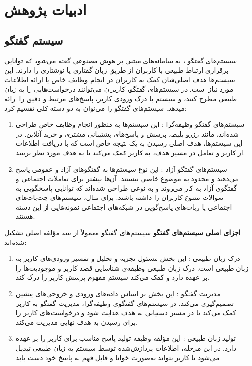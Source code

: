\section{ادبیات پژوهش}
\label{ResearchLiterature:my}

\subsection{سیستم گفتگو}

سیستم‌های گفتگو%
،
 به سامانه‌های مبتنی بر هوش مصنوعی گفته می‌شود که توانایی برقراری ارتباط طبیعی با کاربران از طریق زبان گفتاری یا نوشتاری را دارند. این سیستم‌ها هدف اصلی‌شان کمک به کاربران در انجام وظایف خاص یا ارائه اطلاعات مورد نیاز است. در سیستم‌های گفتگو، کاربران می‌توانند درخواست‌هایی را به زبان طبیعی مطرح کنند، و سیستم با درک ورودی کاربر، پاسخ‌های مرتبط و دقیق را ارائه میدهد.
\newline
سیستم‌های گفتگو را می‌توان به دو دسته کلی تقسیم کرد:
\begin{enumerate}
\item
سیستم‌های گفتگو وظیفه‌گرا%
: این سیستم‌ها به منظور انجام وظایف خاص طراحی شده‌اند، مانند رزرو بلیط، پرسش و پاسخ‌های پشتیبانی مشتری و خرید آنلاین. در این سیستم‌ها، هدف اصلی رسیدن به یک نتیجه خاص است که با دریافت اطلاعات از کاربر و تعامل در مسیر هدف، به کاربر کمک می‌کند تا به هدف مورد نظر برسد.
\item
سیستم‌های گفتگو آزاد%
: این نوع سیستم‌ها به گفتگوهای آزاد و عمومی پاسخ می‌دهند و محدود به موضوع خاصی نیستند. آن‌ها بیشتر برای تعاملات اجتماعی و گفتگوی آزاد به کار می‌روند و به نوعی طراحی شده‌اند که توانایی پاسخگویی به سوالات متنوع کاربران را داشته باشند. برای مثال، سیستم‌های چت‌بات‌های اجتماعی یا ربات‌های پاسخ‌گویی در شبکه‌های اجتماعی نمونه‌هایی از این دسته هستند.
\end{enumerate}

\textbf{اجزای اصلی سیستم‌های گفتگو}\newline
سیستم‌های گفتگو معمولاً از سه مؤلفه اصلی تشکیل شده‌اند:
\begin{enumerate}
\item
درک زبان طبیعی%
: این بخش مسئول تجزیه و تحلیل و تفسیر ورودی‌های کاربر به زبان طبیعی است. درک زبان طبیعی وظیفه‌ی شناسایی قصد کاربر و موجودیت‌ها را بر عهده دارد و کمک می‌کند سیستم مفهوم پرسش کاربر را درک کند.
\item
مدیریت گفتگو%
: این بخش بر اساس داده‌های ورودی و خروجی‌های پیشین تصمیم‌گیری می‌کند. در سیستم‌های گفتگوی وظیفه‌گرا، مدیریت گفتگو به کاربر کمک می‌کند تا در مسیر دستیابی به هدف هدایت شود و درخواست‌های کاربر را برای رسیدن به هدف نهایی مدیریت می‌کند.
\item
تولید زبان طبیعی%
: این مؤلفه وظیفه تولید پاسخ مناسب برای کاربر را بر عهده دارد. در این مرحله، اطلاعات پردازش‌شده توسط سیستم به زبان طبیعی تبدیل می‌شود تا کاربر بتواند به‌صورت خوانا و قابل فهم به پاسخ خود دست یابد.
\end{enumerate}

